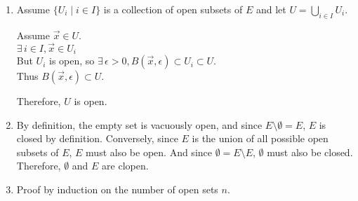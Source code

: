 \documentclass[letterpaper,12pt,fleqn]{article}
\newcommand{\vx}{\vec{x}}
\newcommand{\e}{\epsilon}
\begin{document}
\begin{theproof}
  \listbreak
  \begin{enumerate}
  \item Assume $\{U_i\mid i\in I\}$ is a collection of open subsets of $E$ and
    let $U=\bigcup_{i\in I}U_i$.

    Assume $\vx\in U$. \\
    $\exists\,i\in I,\vx\in U_i$ \\
    But $U_i$ is open, so $\exists\,\e>0,B(\vx,\e)\subset U_i\subset U$. \\
    Thus $B(\vx,\e)\subset U$.

    Therefore, $U$ is open.

  \item By definition, the empty set is vacuously open, and since
    $E\setminus\emptyset=E$, $E$ is closed by definition. Conversely, since
    $E$ is the union of all possible open subsets of $E$, $E$ must also be
    open. And since $\emptyset=E\setminus E$, $\emptyset$ must also be closed.
    Therefore, $\emptyset$ and $E$ are clopen.

  \item Proof by induction on the number of open sets $n$.

\end{enumerate}
\end{theproof}
\end{document}
